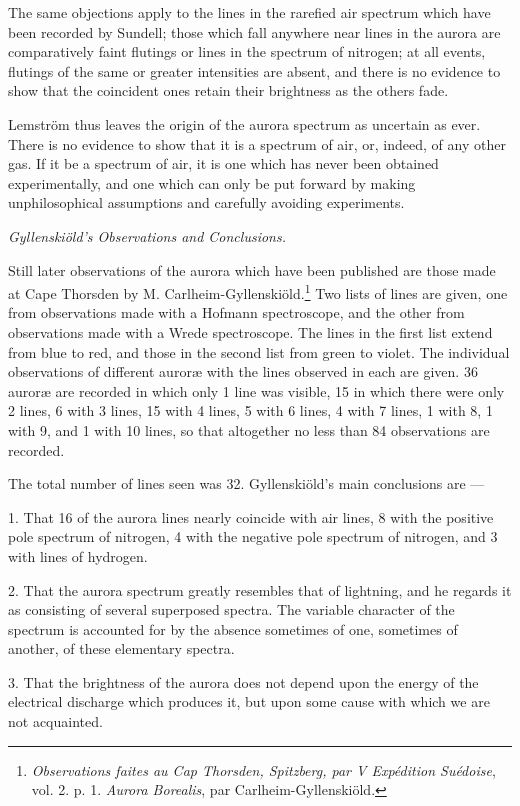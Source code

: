 \documentclass[a4paper, 12pt, oneside, polutonikogreek, english]{article}
\begin{document}
The same objections apply to the lines in the rarefied air spectrum which have been recorded by Sundell; those which fall anywhere near lines in the aurora are comparatively faint flutings or lines in the spectrum of nitrogen; at all events, flutings of the same or greater intensities are absent, and there is no evidence to show that the coincident ones retain their brightness as the others fade.

Lemström thus leaves the origin of the aurora spectrum as uncertain as ever. There is no evidence to show that it is a spectrum of air, or, indeed, of any other gas. If it be a spectrum of air, it is one which has never been obtained experimentally, and one which can only be put forward by making unphilosophical assumptions and carefully avoiding experiments.

\emph{Gyllenskiöld's Observations and Conclusions.}

Still later observations of the aurora which have been published are those made at Cape Thorsden by M. Carlheim-Gyllenskiöld.\footnote{\emph{Observations faites au Cap Thorsden, Spitzberg, par V Expédition Suédoise}, vol. 2. p. 1. \emph{Aurora Borealis}, par Carlheim-Gyllenskiöld.} Two lists of lines are given, one from observations made with a Hofmann spectroscope, and the other from observations made with a Wrede spectroscope. The lines in the first list extend from blue to red, and those in the second list from green to violet. The individual observations of different auroræ with the lines observed in each are given. 36 auroræ are recorded in which only 1 line was visible, 15 in which there were only 2 lines, 6 with 3 lines, 15 with 4 lines, 5 with 6 lines, 4 with 7 lines, 1 with 8, 1 with 9, and 1 with 10 lines, so that altogether no less than 84 observations are recorded.

The total number of lines seen was 32. Gyllenskiöld's main conclusions are ---

1. That 16 of the aurora lines nearly coincide with air lines, 8 with the positive pole spectrum of nitrogen, 4 with the negative pole spectrum of nitrogen, and 3 with lines of hydrogen.

2. That the aurora spectrum greatly resembles that of lightning, and he regards it as consisting of several superposed spectra. The variable character of the spectrum is accounted for by the absence sometimes of one, sometimes of another, of these elementary spectra.

3. That the brightness of the aurora does not depend upon the energy of the electrical discharge which produces it, but upon some cause with which we are not acquainted.
\end{document}
